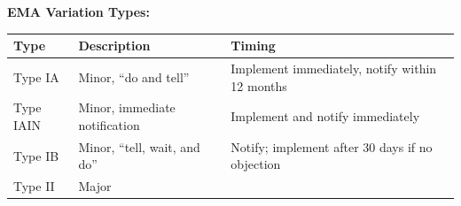 \documentclass[
  11pt,
  a4paper,
]{report}
\begin{document}
\textbf{EMA Variation Types:}

\begin{longtable}[]{@{}lll@{}}
\toprule
\begin{minipage}[b]{0.21\columnwidth}\raggedright
Type\strut
\end{minipage} & \begin{minipage}[b]{0.42\columnwidth}\raggedright
Description\strut
\end{minipage} & \begin{minipage}[b]{0.28\columnwidth}\raggedright
Timing\strut
\end{minipage}\tabularnewline
\midrule
\endhead
\begin{minipage}[t]{0.21\columnwidth}\raggedright
Type IA\strut
\end{minipage} & \begin{minipage}[t]{0.42\columnwidth}\raggedright
Minor, ``do and tell''\strut
\end{minipage} & \begin{minipage}[t]{0.28\columnwidth}\raggedright
Implement immediately, notify within 12 months\strut
\end{minipage}\tabularnewline
\begin{minipage}[t]{0.21\columnwidth}\raggedright
Type IAIN\strut
\end{minipage} & \begin{minipage}[t]{0.42\columnwidth}\raggedright
Minor, immediate notification\strut
\end{minipage} & \begin{minipage}[t]{0.28\columnwidth}\raggedright
Implement and notify immediately\strut
\end{minipage}\tabularnewline
\begin{minipage}[t]{0.21\columnwidth}\raggedright
Type IB\strut
\end{minipage} & \begin{minipage}[t]{0.42\columnwidth}\raggedright
Minor, ``tell, wait, and do''\strut
\end{minipage} & \begin{minipage}[t]{0.28\columnwidth}\raggedright
Notify; implement after 30 days if no objection\strut
\end{minipage}\tabularnewline
\begin{minipage}[t]{0.21\columnwidth}\raggedright
Type II\strut
\end{minipage} & \begin{minipage}[t]{0.42\columnwidth}\raggedright
Major\strut
\end{minipage} & \begin{minipage}[t]{0.28\columnwidth}\raggedright

\end{minipage}
\end{longtable}
\end{document}

